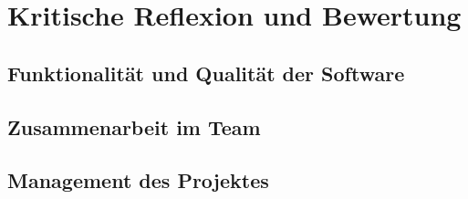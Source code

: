 \section{Kritische Reflexion und Bewertung}

\subsection{Funktionalität und Qualität der Software}

\subsection{Zusammenarbeit im Team}

\subsection{Management des Projektes}